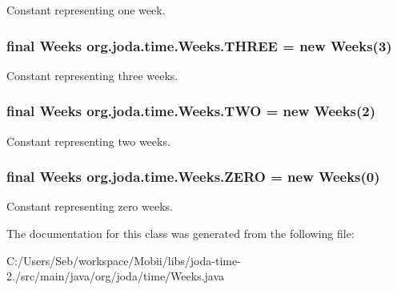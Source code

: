 Constant representing one week. \hypertarget{classorg_1_1joda_1_1time_1_1_weeks_ac63306114df0265a792383927982f4a6}{
\subsubsection[{T\-H\-R\-E\-E}]{\setlength{\rightskip}{0pt plus 5cm}final {\bf Weeks} org.\-joda.\-time.\-Weeks.\-T\-H\-R\-E\-E = new {\bf Weeks}(3)\hspace{0.3cm}{\ttfamily [static]}}}\label{classorg_1_1joda_1_1time_1_1_weeks_ac63306114df0265a792383927982f4a6}
Constant representing three weeks. \hypertarget{classorg_1_1joda_1_1time_1_1_weeks_aec79d3a7021c4178a6ef3d985436583f}{
\subsubsection[{T\-W\-O}]{\setlength{\rightskip}{0pt plus 5cm}final {\bf Weeks} org.\-joda.\-time.\-Weeks.\-T\-W\-O = new {\bf Weeks}(2)\hspace{0.3cm}{\ttfamily [static]}}}\label{classorg_1_1joda_1_1time_1_1_weeks_aec79d3a7021c4178a6ef3d985436583f}
Constant representing two weeks. \hypertarget{classorg_1_1joda_1_1time_1_1_weeks_ac751553008e97d1c09f1ed38761f4f7a}{
\subsubsection[{Z\-E\-R\-O}]{\setlength{\rightskip}{0pt plus 5cm}final {\bf Weeks} org.\-joda.\-time.\-Weeks.\-Z\-E\-R\-O = new {\bf Weeks}(0)\hspace{0.3cm}{\ttfamily [static]}}}\label{classorg_1_1joda_1_1time_1_1_weeks_ac751553008e97d1c09f1ed38761f4f7a}
Constant representing zero weeks. 

The documentation for this class was generated from the following file\-:\begin{DoxyCompactItemize}
\item 
C\-:/\-Users/\-Seb/workspace/\-Mobii/libs/joda-\/time-\/2./src/main/java/org/joda/time/Weeks.\-java\end{DoxyCompactItemize}
